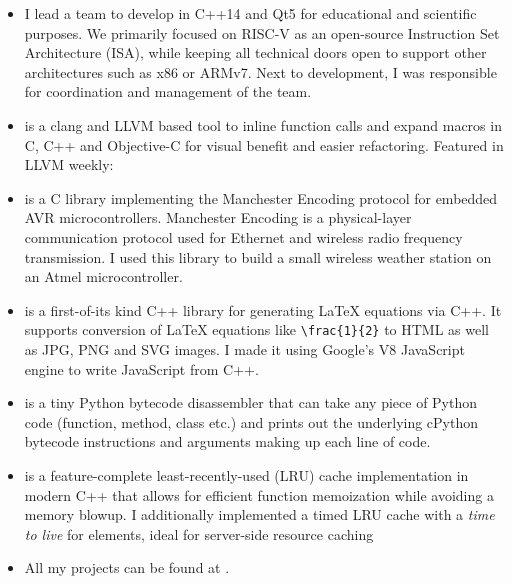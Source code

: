 \begin{itemize}
  \item I lead a team to develop  in C++14 and Qt5 for educational and scientific purposes. We primarily focused on RISC-V as an open-source Instruction Set Architecture (ISA), while keeping all technical doors open to support other architectures such as x86 or ARMv7. Next to development, I was responsible for coordination and management of the team.
  \item {} is a clang and LLVM based tool to inline function calls and expand macros in C, C++ and Objective-C for visual benefit and easier refactoring. Featured in LLVM weekly: 
  \item {} is a C library implementing the Manchester Encoding protocol for embedded AVR microcontrollers. Manchester Encoding is a physical-layer communication protocol used for Ethernet and wireless radio frequency transmission. I used this library to build a small wireless weather station on an Atmel microcontroller.
  \item {} is a first-of-its kind C++ library for generating LaTeX equations via C++. It supports conversion of LaTeX equations like \texttt{\textbackslash frac\{1\}\{2\}} to HTML as well as JPG, PNG and SVG images. I made it using Google's V8 JavaScript engine to write JavaScript from C++.
  \item {} is a tiny Python bytecode disassembler that can take any piece of Python code (function, method, class etc.) and prints out the underlying cPython bytecode instructions and arguments making up each line of code.
  \item {} is a feature-complete least-recently-used (LRU) cache implementation in modern C++ that allows for efficient function memoization while avoiding a memory blowup. I additionally implemented a timed LRU cache with a \emph{time to live} for elements, ideal for server-side resource caching
  \item All my projects can be found at
	.
\end{itemize}

\vspace{-0.25cm}
